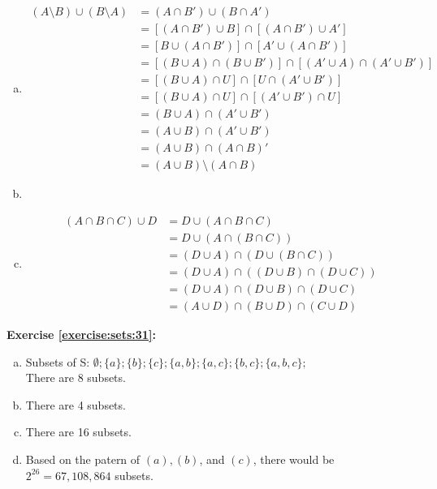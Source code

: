 \begin{enumerate}[(a)]
\item
\begin{align*}
(A \setminus B) \cup (B \setminus A) &= (A\cap B') \cup (B \cap A')\\
&= [(A\cap B') \cup B] \cap [(A \cap B') \cup A']\\
&= [B \cup (A\cap B')] \cap [A' \cup (A \cap B')]\\
&= [(B \cup A) \cap (B \cup B')] \cap [(A' \cup A) \cap (A' \cup B')]\\
&= [(B \cup A) \cap U] \cap [U \cap (A' \cup B')]\\
&= [(B \cup A) \cap U] \cap [(A' \cup B') \cap U]\\
&= (B \cup A) \cap (A' \cup B') \\
&= (A \cup B) \cap (A' \cup B') \\
&= (A \cup B) \cap (A \cap B)' \\
&= (A \cup B) \setminus (A \cap B)
\end{align*}

\item

\item
\begin{align*}
(A \cap B \cap C) \cup D &= D \cup (A \cap B \cap C) \\
&= D \cup (A \cap (B \cap C)) \\
&= (D \cup A) \cap (D \cup (B \cap C)) \\
&= (D \cup A) \cap ((D \cup B) \cap (D \cup C)) \\
&= (D \cup A) \cap (D \cup B) \cap (D \cup C) \\\
&= (A \cup D) \cap (B \cup D) \cap (C \cup D)
\end{align*}
\end{enumerate}

\noindent\textbf{Exercise \ref{exercise:sets:31}:} %
\begin{enumerate}[(a)]
\item
Subsets of S: $\emptyset; \{a\};\{b\};\{c\};\{a,b\};\{a,c\};\{b,c\};\{a,b,c\};$\\
There are 8 subsets.

\item
There are 4 subsets.

\item
There are 16 subsets.

\item
Based on the patern of $(a), (b)$, and $(c)$, there would be $2^{26}=67,108,864$ subsets.
\end{enumerate}

